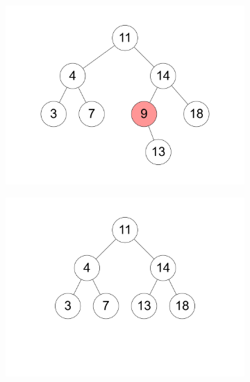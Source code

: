 \documentclass[11pt,a4paper]{article}
\begin{document}
\begin{loesung}
\begin{enumerate}
\begin{figure}[h!]
\begin{subfigure}[b]{0.3\textwidth}
                \includegraphics[width=\textwidth]{img/2d_4}
            \end{subfigure}
            \begin{subfigure}[b]{0.3\textwidth}
                \centering
                \includegraphics[width=\textwidth]{img/2d_5}
            \end{subfigure}
            \begin{subfigure}[b]{0.3\textwidth}
                \centering

\end{subfigure}
\end{figure}
\end{enumerate}
\end{loesung}
\end{document}
